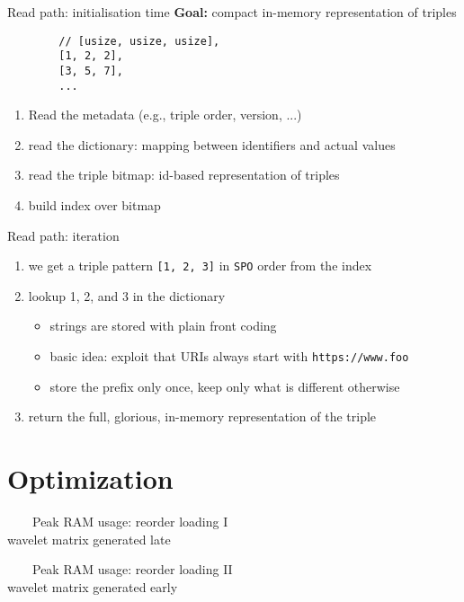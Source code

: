 \documentclass[14pt,aspectratio=169]{beamer}
\newcommand{\imageslide}[4][]
{
\begin{frame}[plain]{~~~~#2}
\vspace{0.2em}
\centering\makebox[\linewidth]{\texttt{[image: \#3]}}
\\#1
\note{#4}
\end{frame}
}
\begin{document}
\begin{frame}[fragile]{Read path: initialisation time}
    \textbf{Goal:} compact in-memory representation of triples
    \begin{verbatim}
        // [usize, usize, usize],
        [1, 2, 2],
        [3, 5, 7],
        ...
    \end{verbatim}
    \begin{enumerate}
        \item Read the metadata (e.g., triple order, version, ...)
        \item read the dictionary: mapping between identifiers and actual values
        \item read the triple bitmap: id-based representation of triples
        \item build index over bitmap
    \end{enumerate}
\end{frame}

\begin{frame}{Read path: iteration}
    \begin{enumerate}
        \item we get a triple pattern \texttt{[1, 2, 3]} in \texttt{SPO} order from the index
        \item lookup 1, 2, and 3 in the dictionary
            \begin{itemize}
                \item strings are stored with plain front coding
                \item basic idea: exploit that URIs always start with \texttt{https://www.foo}
                \item store the prefix only once, keep only what is different otherwise
            \end{itemize}
        \item return the full, glorious, in-memory representation of the triple
    \end{enumerate}
\end{frame}

\section{Optimization}

\imageslide[wavelet matrix generated late]{Peak RAM usage: reorder loading I}{img/matrix-last.png}{}
\imageslide[wavelet matrix generated early]{Peak RAM usage: reorder loading II}{img/matrix-first.png}{}
\end{document}

